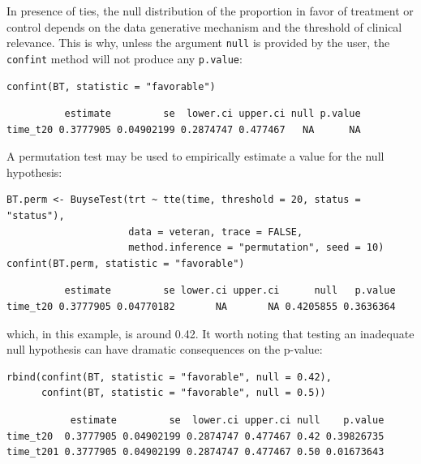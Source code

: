 \documentclass[12pt]{article}
\newcommand\Warning[1][3ex]{%
\renewcommand\stacktype{L}%
\scaleto{\stackon[1.3pt]{\color{red}$\triangle$}{\tiny\bfseries !}}{#1}%
\xspace
}
\begin{document}
\Warning In presence of ties, the null distribution of the proportion
in favor of treatment or control depends on the data generative
mechanism and the threshold of clinical relevance. This is why, unless
the argument \texttt{null} is provided by the user, the \texttt{confint} method will
not produce any \texttt{p.value}:
\lstset{language=r,label= ,caption= ,captionpos=b,numbers=none}
\begin{lstlisting}
confint(BT, statistic = "favorable")
\end{lstlisting}

\begin{verbatim}
          estimate         se  lower.ci upper.ci null p.value
time_t20 0.3777905 0.04902199 0.2874747 0.477467   NA      NA
\end{verbatim}


A permutation test may be used to empirically estimate a value for the
null hypothesis:
\lstset{language=r,label= ,caption= ,captionpos=b,numbers=none}
\begin{lstlisting}
BT.perm <- BuyseTest(trt ~ tte(time, threshold = 20, status = "status"),
                     data = veteran, trace = FALSE,
                     method.inference = "permutation", seed = 10)
confint(BT.perm, statistic = "favorable")
\end{lstlisting}

\begin{verbatim}
          estimate         se lower.ci upper.ci      null   p.value
time_t20 0.3777905 0.04770182       NA       NA 0.4205855 0.3636364
\end{verbatim}


which, in this example, is around 0.42. It worth noting that testing
an inadequate null hypothesis can have dramatic consequences on the
p-value:
\lstset{language=r,label= ,caption= ,captionpos=b,numbers=none}
\begin{lstlisting}
rbind(confint(BT, statistic = "favorable", null = 0.42),
      confint(BT, statistic = "favorable", null = 0.5))
\end{lstlisting}

\begin{verbatim}
           estimate         se  lower.ci upper.ci null    p.value
time_t20  0.3777905 0.04902199 0.2874747 0.477467 0.42 0.39826735
time_t201 0.3777905 0.04902199 0.2874747 0.477467 0.50 0.01673643
\end{verbatim}


\clearpage
\end{document}
